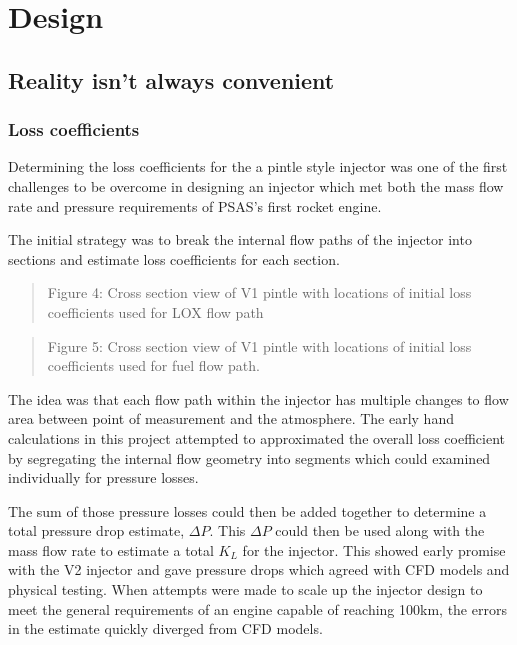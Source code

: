 \documentclass[11pt]{article}
\begin{document}
    \section{Design}\label{design}

\subsection{Reality isn't always
convenient}\label{reality-isnt-always-convenient}

\subsubsection{Loss coefficients}\label{loss-coefficients}

Determining the loss coefficients for the a pintle style injector was
one of the first challenges to be overcome in designing an injector
which met both the mass flow rate and pressure requirements of PSAS's
first rocket engine.

The initial strategy was to break the internal flow paths of the
injector into sections and estimate loss coefficients for each section.

\begin{quote}
Figure 4: Cross section view of V1 pintle with locations of initial loss
coefficients used for LOX flow path
\end{quote}

\begin{quote}
Figure 5: Cross section view of V1 pintle with locations of initial loss
coefficients used for fuel flow path.
\end{quote}

The idea was that each flow path within the injector has multiple
changes to flow area between point of measurement and the atmosphere.
The early hand calculations in this project attempted to approximated
the overall loss coefficient by segregating the internal flow geometry
into segments which could examined individually for pressure losses.

The sum of those pressure losses could then be added together to
determine a total pressure drop estimate, \(\Delta P\). This
\(\Delta P\) could then be used along with the mass flow rate to
estimate a total \(K_L\) for the injector. This showed early promise
with the V2 injector and gave pressure drops which agreed with CFD
models and physical testing. When attempts were made to scale up the
injector design to meet the general requirements of an engine capable of
reaching 100km, the errors in the estimate quickly diverged from CFD
models.
\end{document}
